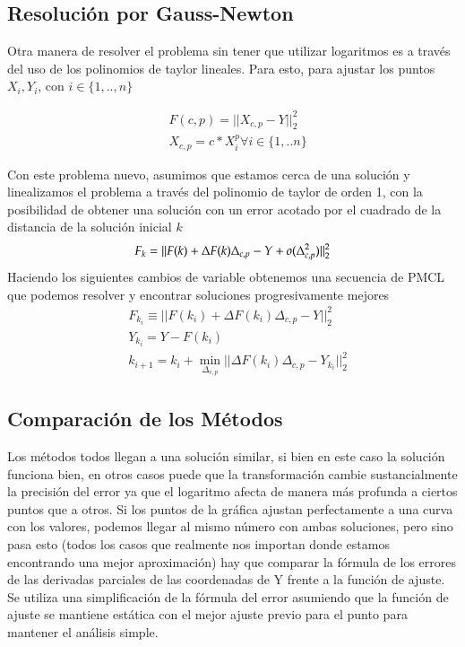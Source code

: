 \documentclass{endm}
\begin{document}



\subsection{Resolución por Gauss-Newton}
Otra manera de resolver el problema sin tener que utilizar logaritmos es a través del uso de los polinomios de taylor lineales. Para esto, para ajustar los puntos $X_i,Y_i$, con $ i \in \{1,..,n\}$

\begin{align*}
&F(c,p) =||X_{c,p} - Y||^2_2 \\
&X_{c,p} = c*X_i^p \forall i \in \{1,..n\}
\end{align*}

Con este problema nuevo, asumimos que estamos cerca de una solución y linealizamos el problema a través del polinomio de taylor de orden 1, con la posibilidad de obtener una solución con un error acotado por el cuadrado de la distancia de la solución inicial $k$
\begin{equation*}
F_k = ||  F(k) + \Delta F(k)\Delta_{c,p} - Y + o(\Delta_{c,p}^2)||^2_2\\
\end{equation*}
Haciendo los siguientes cambios de variable obtenemos una secuencia de PMCL que podemos resolver y encontrar soluciones progresivamente mejores
\begin{align*}
&F_{k_i} \equiv || F(k_i) + \Delta F(k_i)\Delta_{c,p} - Y||^2_2\\
&Y_{k_i} = Y - F(k_i) \\
&k_{i+1} = k_i + \min_{\Delta_{c,p}} || \Delta F(k_i)\Delta_{c,p} - Y_{k_i} ||^2_2
\end{align*}

\subsection{Comparación de los Métodos}
Los métodos todos llegan a una solución similar, si bien en este caso la solución funciona bien, en otros casos puede que la transformación cambie sustancialmente la precisión del error ya que el logaritmo afecta de manera más profunda a ciertos puntos que a otros. Si los puntos de la gráfica ajustan perfectamente a una curva con los valores, podemos llegar al mismo número con ambas soluciones, pero sino pasa esto (todos los casos que realmente nos importan donde estamos encontrando una mejor aproximación) hay que comparar la fórmula de los errores de las derivadas parciales de las coordenadas de Y frente a la función de ajuste. Se utiliza una simplificación de la fórmula del error asumiendo que la función de ajuste se mantiene estática con el mejor ajuste previo para el punto para mantener el análisis simple.
\end{document}
